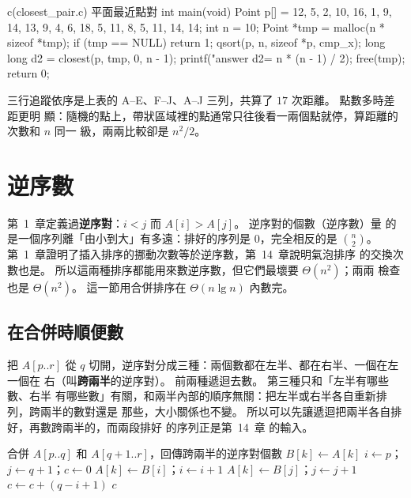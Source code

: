 \begin{example}[label=ex:dc-closest]{c}{(closest\_pair.c) 平面最近點對}
int main(void)
{
    Point p[] = {{12, 5}, {2, 10}, {16, 1}, {9, 14}, {13, 9},
                 {4, 6}, {18, 5}, {11, 8}, {5, 11}, {14, 14}};
    int n = 10;
    Point *tmp = malloc(n * sizeof *tmp);
    if (tmp == NULL) {
        return 1;
    }
    qsort(p, n, sizeof *p, cmp_x);
    long long d2 = closest(p, tmp, 0, n - 1);
    printf("answer d2=%
           n * (n - 1) / 2);
    free(tmp);
    return 0;
}
\end{example}

三行追蹤依序是上表的 A--E、F--J、A--J 三列，共算了 $17$ 次距離。 點數多時差距更明
顯：隨機的點上，帶狀區域裡的點通常只往後看一兩個點就停，算距離的次數和 $n$ 同一
級，兩兩比較卻是 $n^2/2$。

\section{逆序數}
\label{sec:dc-inv}

第~1~章定義過\textbf{逆序對}：$i < j$ 而 $A[i] > A[j]$。 逆序對的個數（逆序數）量
的是一個序列離「由小到大」有多遠：排好的序列是 $0$，完全相反的是
$\binom{n}{2}$。 第~1~章證明了插入排序的挪動次數等於逆序數，第~14~章說明氣泡排序
的交換次數也是。 所以這兩種排序都能用來數逆序數，但它們最壞要 $\Theta(n^2)$；兩兩
檢查也是 $\Theta(n^2)$。 這一節用合併排序在 $\Theta(n \lg n)$ 內數完。

\subsection{在合併時順便數}

把 $A[p..r]$ 從 $q$ 切開，逆序對分成三種：兩個數都在左半、都在右半、一個在左一個在
右（叫\textbf{跨兩半}的逆序對）。 前兩種遞迴去數。 第三種只和「左半有哪些數、右半
有哪些數」有關，和兩半內部的順序無關：把左半或右半各自重新排列，跨兩半的數對還是
那些，大小關係也不變。 所以可以先讓遞迴把兩半各自排好，再數跨兩半的，而兩段排好
的序列正是第~14~章  的輸入。

\begin{pseudo}[label=alg:dc-merge-count]{合併 $A[p..q]$ 和 $A[q+1..r]$，回傳跨兩半的逆序對個數}
        \State $B[k] \gets A[k]$
    \EndFor
    \State $i \gets p$；$j \gets q + 1$；$c \gets 0$
            \State $A[k] \gets B[i]$；$i \gets i + 1$
        \Else
            \State $A[k] \gets B[j]$；$j \gets j + 1$
            \State $c \gets c + (q - i + 1)$ 
        \EndIf
    \EndFor
    \State \Return $c$
\EndFunction
\end{pseudo}

